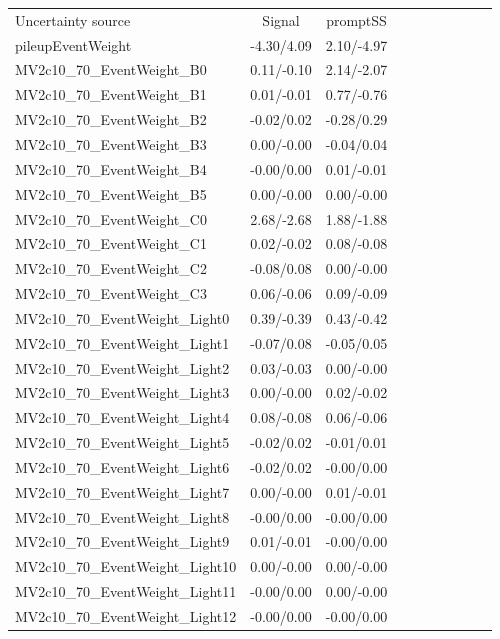 \begin{table}[h]
\scriptsize
\begin{center}
\begin{tabular}{l|ccccccccc}
\hline
\hline
Uncertainty source &Signal &promptSS \\
pileupEventWeight &-4.30/4.09 &2.10/-4.97 \\
MV2c10\_70\_EventWeight\_B0 &0.11/-0.10 &2.14/-2.07 \\
MV2c10\_70\_EventWeight\_B1 &0.01/-0.01 &0.77/-0.76 \\
MV2c10\_70\_EventWeight\_B2 &-0.02/0.02 &-0.28/0.29 \\
MV2c10\_70\_EventWeight\_B3 &0.00/-0.00 &-0.04/0.04 \\
MV2c10\_70\_EventWeight\_B4 &-0.00/0.00 &0.01/-0.01 \\
MV2c10\_70\_EventWeight\_B5 &0.00/-0.00 &0.00/-0.00 \\
MV2c10\_70\_EventWeight\_C0 &2.68/-2.68 &1.88/-1.88 \\
MV2c10\_70\_EventWeight\_C1 &0.02/-0.02 &0.08/-0.08 \\
MV2c10\_70\_EventWeight\_C2 &-0.08/0.08 &0.00/-0.00 \\
MV2c10\_70\_EventWeight\_C3 &0.06/-0.06 &0.09/-0.09 \\
MV2c10\_70\_EventWeight\_Light0 &0.39/-0.39 &0.43/-0.42 \\
MV2c10\_70\_EventWeight\_Light1 &-0.07/0.08 &-0.05/0.05 \\
MV2c10\_70\_EventWeight\_Light2 &0.03/-0.03 &0.00/-0.00 \\
MV2c10\_70\_EventWeight\_Light3 &0.00/-0.00 &0.02/-0.02 \\
MV2c10\_70\_EventWeight\_Light4 &0.08/-0.08 &0.06/-0.06 \\
MV2c10\_70\_EventWeight\_Light5 &-0.02/0.02 &-0.01/0.01 \\
MV2c10\_70\_EventWeight\_Light6 &-0.02/0.02 &-0.00/0.00 \\
MV2c10\_70\_EventWeight\_Light7 &0.00/-0.00 &0.01/-0.01 \\
MV2c10\_70\_EventWeight\_Light8 &-0.00/0.00 &-0.00/0.00 \\
MV2c10\_70\_EventWeight\_Light9 &0.01/-0.01 &-0.00/0.00 \\
MV2c10\_70\_EventWeight\_Light10 &0.00/-0.00 &0.00/-0.00 \\
MV2c10\_70\_EventWeight\_Light11 &-0.00/0.00 &0.00/-0.00 \\
MV2c10\_70\_EventWeight\_Light12 &-0.00/0.00 &-0.00/0.00 \\

\end{tabular}
\end{center}
\end{table}
